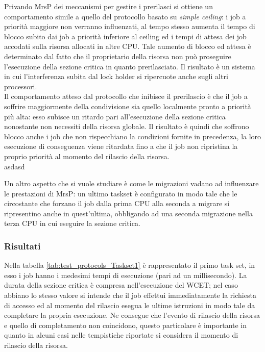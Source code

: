 {\noindent Privando MrsP dei meccanismi per gestire i prerilasci si ottiene un comportamento simile a quello del protocollo basato su \textit{simple ceiling}: i job a priorità maggiore non verranno influenzati, al tempo stesso aumenta il tempo di blocco subito dai job a priorità inferiore al ceiling ed i tempi di attesa dei job accodati sulla risorsa allocati in altre CPU. Tale aumento di blocco ed attesa è determinato dal fatto che il proprietario della risorsa non può proseguire l'esecuzione della sezione critica in quanto prerilasciato. Il risultato è un sistema in cui l'interferenza subita dal lock holder si ripercuote anche sugli altri processori.\\

\noindent Il comportamento atteso dal protocollo che inibisce il prerilascio è che il job a soffrire maggiormente della condivisione sia quello localmente pronto a priorità più alta: esso subisce un ritardo pari all'esecuzione della sezione critica nonostante non necessiti della risorsa globale. Il risultato è quindi che soffrono blocco anche i job che non rispecchiano la condizioni fornite in precedenza, la loro esecuzione di conseguenza viene ritardata fino a che il job non ripristina la proprio priorità al momento del rilascio della risorsa.\\

asdasd

\noindent Un altro aspetto che si vuole studiare è come le migrazioni vadano ad influenzare le prestazioni di MrsP: un ultimo taskset è configurato in modo tale che le circostante che forzano il job dalla prima CPU alla seconda a migrare si ripresentino anche in quest'ultima, obbligando ad una seconda migrazione nella terza CPU in cui eseguire la sezione critica.

\subsubsection{Risultati}
\label{sec:confronto_protocolli_ris}

Nella tabella \ref{tab:test_protocols_Taskset1} è rappresentato il primo task set, in esso i job hanno i medesimi tempi di esecuzione (pari ad un millisecondo). La durata della sezione critica è compresa nell'esecuzione del WCET; nel caso abbiano lo stesso valore si intende che il job effettui immediatamente la richiesta di accesso ed al momento del rilascio esegua le ultime istruzioni in modo tale da completare la propria esecuzione. Ne consegue che l'evento di rilascio della risorsa e quello di completamento non coincidono, questo particolare è importante in quanto in alcuni casi nelle tempistiche riportate si considera il momento di rilascio della risorsa.\\

}
